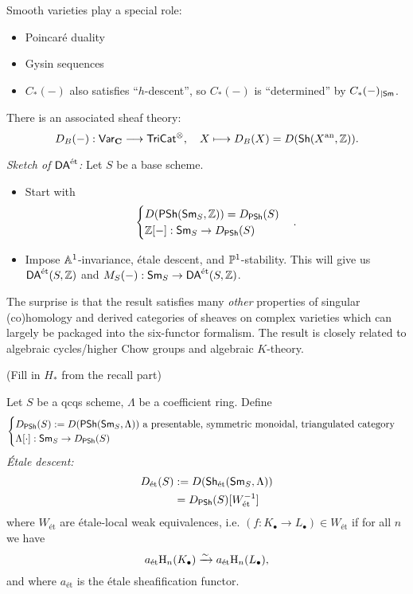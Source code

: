Smooth varieties play a special role:
\begin{itemize}
\item Poincar\'e duality
\item Gysin sequences
\item $C_*(-)$ also satisfies ``$h$-descent'', so $C_*(-)$ is ``determined'' by $C_*(-)_{|\Sm}$.
\end{itemize}
There is an associated sheaf theory:
\[
D_B(-):\cat{Var}_{\bb{C}}\to \cat{TriCat}^{\otimes},\quad X\mapsto D_B(X) = D(\Sh(X\an,\Z))
.\]

\emph{Sketch of $\DAet$:} Let $S$ be a base scheme.
\begin{itemize}
\item Start with
\[
\begin{cases}
D(\PSh(\Sm_S, \Z)) = D_{\PSh}(S) \\
\Z[-]: \Sm_S \to D_{\PSh}(S)
\end{cases}
.\]
\item Impose $\Aff^{1}$-invariance, \'etale descent, and $\P^{1}$-stability. This will
give us $\DAet(S,\Z)$ and $M_S(-):\Sm_S\to \DAet(S,\Z)$.
\end{itemize}
The surprise is that the result satisfies many \emph{other} properties of singular
(co)homology and derived categories of sheaves on complex varieties which can largely be
packaged into the six-functor formalism. The result is closely related to algebraic
cycles/higher Chow groups and algebraic $K$-theory.

(Fill in $H_*$ from the recall part)

Let $S$ be a qcqs scheme, $\Lambda$ be a coefficient ring. Define
\[
\begin{cases}
D_{\PSh}(S) \defeq D(\PSh(\Sm_S,\Lambda)) \text{ a presentable, symmetric monoidal,
triangulated category}\\
\Lambda[\cdot ]:\Sm_S \to D_{\PSh}(S)
\end{cases}
\]
\emph{\'Etale descent:}
\begin{align*}
D_{\text{\'et}}(S) &\defeq D(\Sh_{\text{\'et}}(\Sm_S,\Lambda)) \\
&= D_{\PSh}(S)[W_{\text{\'et}}^{-1}]
\end{align*}
where $W_{\text{\'et}}$ are \'etale-local weak equivalences, i.e. $(f:K_\bullet\to
L_\bullet)\in W_{\text{\'et}}$ if for all $n$ we have
\[
a_{\text{\'et}}\CH_n(K_\bullet) \simto a_{\text{\'et}}\CH_n(L_\bullet),
\]
and where $a_{\text{\'et}}$ is the étale sheafification functor.

